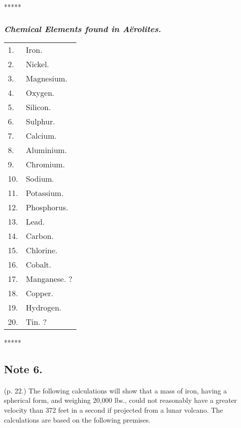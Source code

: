 \documentclass[a4paper, 12pt, oneside]{article}
\begin{document}
\centerline{*\hspace{15mm}*\hspace{15mm}*\hspace{15mm}*\hspace{15mm}*}
\bigskip

\subsubsection{\emph{Chemical Elements found in Aërolites.}}
\begin{table}[H]
    \centering
    \normalsize
    \Fontauri
    \begin{tabular}{l l}
        1. & Iron. \\
        2. & Nickel. \\
        3. & Magnesium. \\
        4. & Oxygen. \\
        5. & Silicon. \\
        6. & Sulphur. \\
        7. & Calcium. \\
        8. & Aluminium. \\
        9. & Chromium. \\
        10. & Sodium. \\
        11. & Potassium. \\
        12. & Phosphorus. \\
        13. & Lead. \\
        14. & Carbon. \\
        15. & Chlorine. \\
        16. & Cobalt. \\
        17. & Manganese. ? \\
        18. & Copper. \\
        19. & Hydrogen. \\
        20. & Tin. ? \\
    \end{tabular}
\end{table}

\centerline{*\hspace{15mm}*\hspace{15mm}*\hspace{15mm}*\hspace{15mm}*}
\bigskip

\subsection{Note 6.}
\paragraph{}
(p. 22.) The following calculations will show that a mass of iron, having a spherical form, and weighing 20,000 lbs., could not reasonably have a greater velocity than 372 feet in a second if projected from a lunar volcano. The calculations are based on the following premises.
\end{document}
